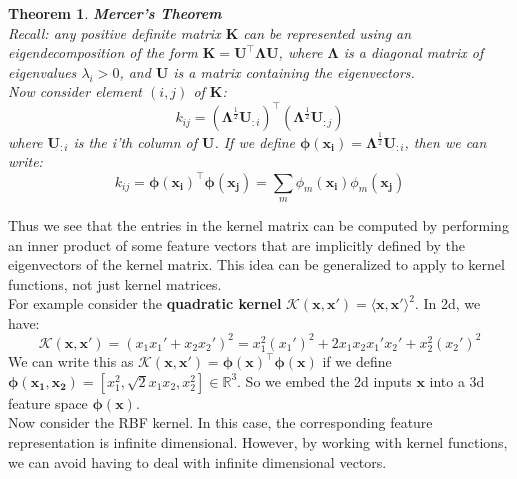 \documentclass[twoside]{article}
\newcounter{lecnum}
\newtheorem{theorem}{Theorem}[lecnum]
\begin{document}
\begin{theorem}{\textbf{Mercer's  Theorem}\\}
Recall: any positive definite matrix $\boldsymbol{K}$ can be represented using an eigendecomposition of the form $\boldsymbol{K = U^\intercal\Lambda U}$, where $\boldsymbol{\Lambda}$ is a diagonal matrix of eigenvalues $\lambda_i > 0$, and $\boldsymbol{U}$ is a matrix containing the eigenvectors.\\
Now consider element $(i, j)$ of $\boldsymbol{K}$:
\begin{equation*}
    k_{ij} = (\boldsymbol{\Lambda}^\frac{1}{2}\boldsymbol{U}_{:i})^\intercal(\boldsymbol{\Lambda}^\frac{1}{2}\boldsymbol{U}_{:j})
\end{equation*}
where $\boldsymbol{U}_{:i}$ is the \textit{i}'th column of $\boldsymbol{U}$. If we define $\boldsymbol{\phi(x_i)} = \boldsymbol{\Lambda}^\frac{1}{2}\boldsymbol{U}_{:i}$, then we can write:
\begin{equation*}
    k_{ij} = \boldsymbol{\phi(x_i)}^\intercal \boldsymbol{\phi(x_j)} = \sum\limits_m \phi_m (\boldsymbol{x_i})\phi_m(\boldsymbol{x_j})
\end{equation*}
\end{theorem}
Thus we see that the entries in the kernel matrix can be computed by performing an inner product of some feature vectors that are implicitly defined by the eigenvectors of the kernel matrix. This idea can be generalized to apply to kernel functions, not just kernel matrices.\\
For example consider the \textbf{quadratic kernel} $\mathcal{K}(\boldsymbol{x}, \boldsymbol{x'}) = \langle\boldsymbol{x}, \boldsymbol{x'}\rangle^2$. In 2d, we have:
\begin{equation*}
    \mathcal{K}(\boldsymbol{x}, \boldsymbol{x'}) = (x_1x_1' + x_2x_2')^2 = x_1^2(x_1')^2 + 2x_1x_2x_1'x_2' + x_2^2(x_2')^2
\end{equation*}
We can write this as $\mathcal{K}(\boldsymbol{x}, \boldsymbol{x'}) = \boldsymbol{\phi(x)}^\intercal\boldsymbol{\phi(x)}$ if we define $\boldsymbol{\phi(x_1, x_2)} = [x_1^2, \sqrt{2}x_1x_2, x_2^2] \in \mathbb{R}^3$. So we embed the 2d inputs $\boldsymbol{x}$ into a 3d feature space $\boldsymbol{\phi(x)}$.\\
Now consider the RBF kernel. In this case, the corresponding feature representation is infinite dimensional. However, by working with kernel functions, we can avoid having to deal with infinite dimensional vectors.
\newpage
\end{document}
